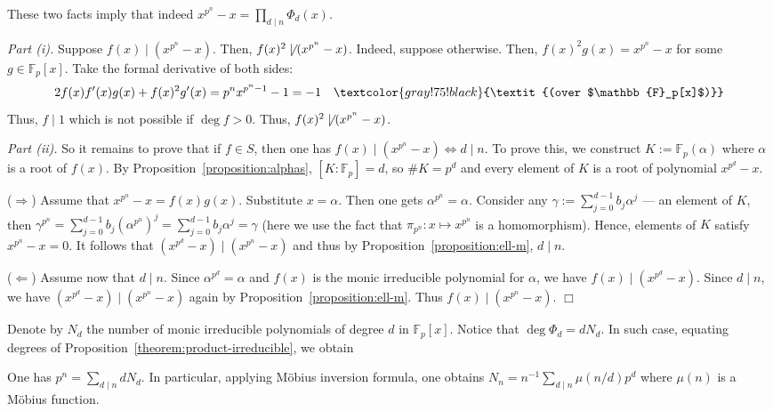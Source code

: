\documentclass{template}
\newcommand{\qedwhite}{\hfill \ensuremath{\Box}}
\begin{document}
These two facts imply that indeed $x^{p^n}-x = \prod_{d \mid n}\Phi_d(x)$.

\textcolor{blue!70!black}{\textit{Part (i).}} Suppose $f(x) \mid (x^{p^n}-x)$. Then, $f(x)^2 \not\mid
(x^{p^n}-x)$. Indeed, suppose otherwise. Then, $f(x)^2g(x) = x^{p^n}-x$ for some
$g \in \mathbb{F}_p[x]$. Take the formal derivative of both sides:
\begin{equation*}
    2f(x)f'(x)g(x) + f(x)^2g'(x) = p^n x^{p^n-1} - 1 = -1 \quad \textcolor{gray!75!black}{\textit{(over $\mathbb{F}_p[x]$)}}
\end{equation*}
Thus, $f \mid 1$ which is not possible if $\deg f > 0$. Thus, $f(x)^2 \not\mid
(x^{p^n}-x)$.

\textcolor{blue!70!black}{\textit{Part (ii).}} So it remains to prove that if $f
\in S$, then one has $f(x) \mid (x^{p^n}-x) \iff d \mid n$. To prove this, we
construct $K := \mathbb{F}_p(\alpha)$ where $\alpha$ is a root of $f(x)$. By
Proposition~\ref{proposition:alphas}, $[K\!:\!\mathbb{F}_p]=d$, so $\#K = p^d$
and every element of $K$ is a root of polynomial $x^{p^d}-x$.

($\Rightarrow$) Assume that $x^{p^n}-x=f(x)g(x)$. Substitute $x=\alpha$. Then
one gets $\alpha^{p^n}=\alpha$. Consider any $\gamma :=
\sum_{j=0}^{d-1}b_j\alpha^j$ --- an element of $K$, then $\gamma^{p^n} =
\sum_{j=0}^{d-1}b_j(\alpha^{p^n})^j = \sum_{j=0}^{d-1}b_j\alpha^j = \gamma$
(here we use the fact that $\pi_{p^n}: x \mapsto x^{p^n}$ is a homomorphism).
Hence, elements of $K$ satisfy $x^{p^n}-x=0$. It follows that $(x^{p^d}-x) \mid
(x^{p^n}-x)$ and thus by Proposition~\ref{proposition:ell-m}, $d \mid n$.

($\Leftarrow$) Assume now that $d \mid n$. Since $\alpha^{p^d} = \alpha$ and $f(x)$ is the monic 
irreducible polynomial for $\alpha$, we have $f(x) \mid (x^{p^d}-x)$. Since $d \mid n$,
we have $(x^{p^d}-x) \mid (x^{p^n}-x)$ again by Proposition~\ref{proposition:ell-m}.
Thus $f(x) \mid (x^{p^n}-x)$. \qedwhite

Denote by $N_d$ the number of monic irreducible polynomials of degree $d$ in
$\mathbb{F}_p[x]$. Notice that $\deg \Phi_d = dN_d$. In such case, equating degrees 
of Proposition~\ref{theorem:product-irreducible}, we obtain
\begin{proposition}\label{proposition:nd} One has $p^n = \sum_{d \mid n}dN_d$.
    In particular, applying Möbius inversion formula, one obtains $N_n =
    n^{-1}\sum_{d \mid n}\mu(n/d)p^d$ where $\mu(n)$ is a Möbius function.
\end{proposition}
\end{document}
